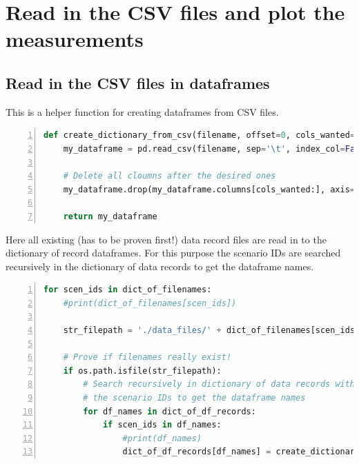\documentclass[10pt,parskip=half,
toc=sectionentrywithdots,
bibliography=totocnumbered,
captions=tableheading,numbers=noendperiod]{scrartcl}
\begin{document}
\hypertarget{read-in-the-csv-files-and-plot-the-measurements}{%
\section{Read in the CSV files and plot the
measurements}\label{read-in-the-csv-files-and-plot-the-measurements}}

\hypertarget{read-in-the-csv-files-in-dataframes}{%
\subsection{Read in the CSV files in
dataframes}\label{read-in-the-csv-files-in-dataframes}}

This is a helper function for creating dataframes from CSV files.

\begin{lstlisting}[language=Python,numbers=left,xleftmargin=20pt,xrightmargin=5pt,belowskip=5pt,aboveskip=5pt]
def create_dictionary_from_csv(filename, offset=0, cols_wanted=1):
    my_dataframe = pd.read_csv(filename, sep='\t', index_col=False, decimal='.', header=offset)

    # Delete all cloumns after the desired ones
    my_dataframe.drop(my_dataframe.columns[cols_wanted:], axis=1, inplace=True)

    return my_dataframe
\end{lstlisting}

Here all existing (has to be proven first!) data record files are read
in to the dictionary of record dataframes. For this purpose the scenario
IDs are searched recursively in the dictionary of data records to get
the dataframe names.

\begin{lstlisting}[language=Python,numbers=left,xleftmargin=20pt,xrightmargin=5pt,belowskip=5pt,aboveskip=5pt]
for scen_ids in dict_of_filenames:
    #print(dict_of_filenames[scen_ids])

    str_filepath = './data_files/' + dict_of_filenames[scen_ids] +'.csv'

    # Prove if filenames really exist!
    if os.path.isfile(str_filepath):
        # Search recursively in dictionary of data records with
        # the scenario IDs to get the dataframe names
        for df_names in dict_of_df_records:
            if scen_ids in df_names:
                #print(df_names)
                dict_of_df_records[df_names] = create_dictionary_from_csv(filename=str_filepath, offset=0, cols_wanted=4)
\end{lstlisting}
\end{document}
